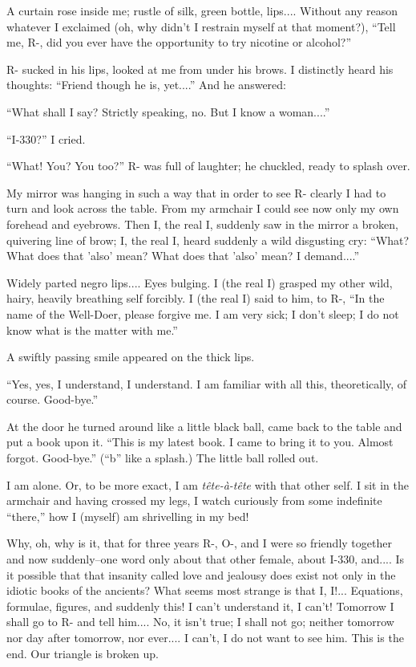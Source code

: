 \documentclass[11pt,openany]{book}
\begin{document}
A curtain rose inside me; rustle of silk, green bottle, lips.... Without any reason whatever I exclaimed (oh, why didn't I restrain myself at that moment?), ``Tell me, R-, did you ever have the opportunity to try nicotine or alcohol?''

R- sucked in his lips, looked at me from under his brows. I distinctly heard his thoughts: ``Friend though he is, yet....'' And he answered:

``What shall I say? Strictly speaking, no. But I know a woman....''

``I-330?'' I cried.

``What! You? You too?'' R- was full of laughter; he chuckled, ready to splash over.

My mirror was hanging in such a way that in order to see R- clearly I had to turn and look across the table. From my armchair I could see now only my own forehead and eyebrows. Then I, the real I, suddenly saw in the mirror a broken, quivering line of brow; I, the real I, heard suddenly a wild disgusting cry: ``What? What does that 'also' mean? What does that 'also' mean? I demand....''

Widely parted negro lips.... Eyes bulging. I (the real I) grasped my other wild, hairy, heavily breathing self forcibly. I (the real I) said to him, to R-, ``In the name of the Well-Doer, please forgive me. I am very sick; I don't sleep; I do not know what is the matter with me.''

A swiftly passing smile appeared on the thick lips.

``Yes, yes, I understand, I understand. I am familiar with all this, theoretically, of course. Good-bye.''

At the door he turned around like a little black ball, came back to the table and put a book upon it. ``This is my latest book. I came to bring it to you. Almost forgot. Good-bye.'' (``b'' like a splash.) The little ball rolled out.

I am alone. Or, to be more exact, I am \emph{tête-à-tête} with that other self. I sit in the armchair and having crossed my legs, I watch curiously from some indefinite ``there,'' how I (myself) am shrivelling in my bed!

Why, oh, why is it, that for three years R-, O-, and I were so friendly together and now suddenly--one word only about that other female, about I-330, and.... Is it possible that that insanity called love and jealousy does exist not only in the idiotic books of the ancients? What seems most strange is that I, I!... Equations, formulae, figures, and suddenly this! I can't understand it, I can't! Tomorrow I shall go to R- and tell him.... No, it isn't true; I shall not go; neither tomorrow nor day after tomorrow, nor ever.... I can't, I do not want to see him. This is the end. Our triangle is broken up.
\end{document}
